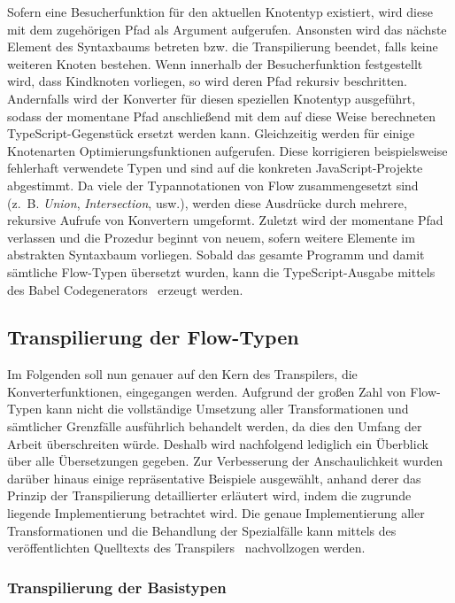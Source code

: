 Sofern eine Besucherfunktion für den aktuellen Knotentyp existiert, wird diese mit dem zugehörigen Pfad als Argument aufgerufen. Ansonsten wird das nächste Element des Syntaxbaums betreten bzw. die Transpilierung beendet, falls keine weiteren Knoten bestehen. Wenn innerhalb der Besucherfunktion festgestellt wird, dass Kindknoten vorliegen, so wird deren Pfad rekursiv beschritten. Andernfalls wird der Konverter für diesen speziellen Knotentyp ausgeführt, sodass der momentane Pfad anschließend mit dem auf diese Weise berechneten TypeScript-Gegenstück ersetzt werden kann. Gleichzeitig werden für einige Knotenarten Optimierungsfunktionen aufgerufen. Diese korrigieren beispielsweise fehlerhaft verwendete Typen und sind auf die konkreten JavaScript-Projekte abgestimmt. Da viele der Typannotationen von Flow zusammengesetzt sind (z.~B. \textit{Union}, \textit{Intersection}, usw.), werden diese Ausdrücke durch mehrere, rekursive Aufrufe von Konvertern umgeformt. Zuletzt wird der momentane Pfad verlassen und die Prozedur beginnt von neuem, sofern weitere Elemente im abstrakten Syntaxbaum vorliegen. Sobald das gesamte Programm und damit sämtliche Flow-Typen übersetzt wurden, kann die TypeScript-Ausgabe mittels des Babel Codegenerators~\autocite{BABEL:GENERATOR} erzeugt werden.

\subsection{Transpilierung der Flow-Typen}

Im Folgenden soll nun genauer auf den Kern des Transpilers, die Konverterfunktionen, eingegangen werden. Aufgrund der großen Zahl von Flow-Typen kann nicht die vollständige Umsetzung aller Transformationen und sämtlicher Grenzfälle ausführlich behandelt werden, da dies den Umfang der Arbeit überschreiten würde. Deshalb wird nachfolgend lediglich ein Überblick über alle Übersetzungen gegeben. Zur Verbesserung der Anschaulichkeit wurden darüber hinaus einige repräsentative Beispiele ausgewählt, anhand derer das Prinzip der Transpilierung detaillierter erläutert wird, indem die zugrunde liegende Implementierung betrachtet wird. Die genaue Implementierung aller Transformationen und die Behandlung der Spezialfälle kann mittels des veröffentlichten Quelltexts des Transpilers~\autocite{REFLOW_GITHUB} nachvollzogen werden.

\subsubsection{Transpilierung der Basistypen}

